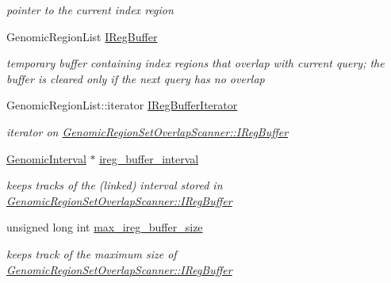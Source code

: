 \begin{CompactItemize}
\begin{CompactList}\small\item\em pointer to the current index region \item\end{CompactList}\item 
\hypertarget{classGenomicRegionSetOverlapScanner_5cef1f4f621533d6ce6a47fc106f35cd}{
GenomicRegionList \hyperlink{classGenomicRegionSetOverlapScanner_5cef1f4f621533d6ce6a47fc106f35cd}{IRegBuffer}}
\label{classGenomicRegionSetOverlapScanner_5cef1f4f621533d6ce6a47fc106f35cd}

\begin{CompactList}\small\item\em temporary buffer containing index regions that overlap with current query; the buffer is cleared only if the next query has no overlap \item\end{CompactList}\item 
\hypertarget{classGenomicRegionSetOverlapScanner_ab1a082fe808c27618040dfa0537fb5e}{
GenomicRegionList::iterator \hyperlink{classGenomicRegionSetOverlapScanner_ab1a082fe808c27618040dfa0537fb5e}{IRegBufferIterator}}
\label{classGenomicRegionSetOverlapScanner_ab1a082fe808c27618040dfa0537fb5e}

\begin{CompactList}\small\item\em iterator on \hyperlink{classGenomicRegionSetOverlapScanner_5cef1f4f621533d6ce6a47fc106f35cd}{GenomicRegionSetOverlapScanner::IRegBuffer} \item\end{CompactList}\item 
\hypertarget{classGenomicRegionSetOverlapScanner_4dc563efd11721122a7863d574801cc8}{
\hyperlink{classGenomicInterval}{GenomicInterval} $\ast$ \hyperlink{classGenomicRegionSetOverlapScanner_4dc563efd11721122a7863d574801cc8}{ireg\_\-buffer\_\-interval}}
\label{classGenomicRegionSetOverlapScanner_4dc563efd11721122a7863d574801cc8}

\begin{CompactList}\small\item\em keeps tracks of the (linked) interval stored in \hyperlink{classGenomicRegionSetOverlapScanner_5cef1f4f621533d6ce6a47fc106f35cd}{GenomicRegionSetOverlapScanner::IRegBuffer} \item\end{CompactList}\item 
\hypertarget{classGenomicRegionSetOverlapScanner_4c8c433190c5f9a12754ae096ec2e8e5}{
unsigned long int \hyperlink{classGenomicRegionSetOverlapScanner_4c8c433190c5f9a12754ae096ec2e8e5}{max\_\-ireg\_\-buffer\_\-size}}
\label{classGenomicRegionSetOverlapScanner_4c8c433190c5f9a12754ae096ec2e8e5}

\begin{CompactList}\small\item\em keeps track of the maximum size of \hyperlink{classGenomicRegionSetOverlapScanner_5cef1f4f621533d6ce6a47fc106f35cd}{GenomicRegionSetOverlapScanner::IRegBuffer} \item\end{CompactList}\end{CompactItemize}


